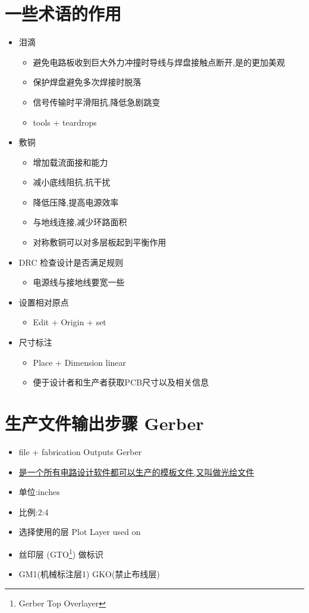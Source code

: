 \documentclass[11pt]{article}
\begin{document}
\section{一些术语的作用}
\label{sec:org046157c}
\begin{itemize}
\item 泪滴
\begin{itemize}
\item 避免电路板收到巨大外力冲撞时导线与焊盘接触点断开,是的更加美观
\item 保护焊盘避免多次焊接时脱落
\item 信号传输时平滑阻抗,降低急剧跳变
\item tools + teardrops
\end{itemize}
\item 敷铜
\begin{itemize}
\item 增加载流面接和能力
\item 减小底线阻抗,抗干扰
\item 降低压降,提高电源效率
\item 与地线连接,减少环路面积
\item 对称敷铜可以对多层板起到平衡作用
\end{itemize}
\item DRC 检查设计是否满足规则
\begin{itemize}
\item 电源线与接地线要宽一些
\end{itemize}
\item 设置相对原点
\begin{itemize}
\item Edit + Origin + set
\end{itemize}
\item 尺寸标注
\begin{itemize}
\item Place + Dimension linear
\item 便于设计者和生产者获取PCB尺寸以及相关信息
\end{itemize}
\end{itemize}
\section{生产文件输出步骤 Gerber}
\label{sec:orga2d081a}
\begin{itemize}
\item file + fabrication Outputs Gerber
\item \uline{是一个所有电路设计软件都可以生产的模板文件,又叫做光绘文件}
\item 单位:inches
\item 比例:2:4
\item 选择使用的层 Plot Layer used on
\item 丝印层 (GTO\footnote{Gerber Top Overlayer}) 做标识
\item GM1(机械标注层1) GKO(禁止布线层)
\end{itemize}
\end{document}
